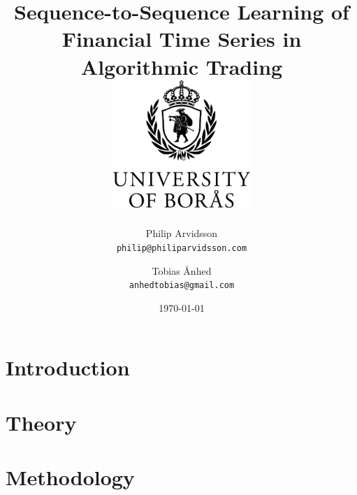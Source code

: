 \documentclass[11pt]{report}
\title{
  {\huge{Sequence-to-Sequence Learning of Financial Time Series in Algorithmic
         Trading}}\\
  \vspace{10ex}
  \includegraphics[width=52mm]{HB_EN_logo1_K}
  \vspace{4ex}
}
\author{
       \LARGE{Philip Arvidsson} \\ \texttt{philip@philiparvidsson.com}
  \and \LARGE{Tobias Ånhed}     \\ \texttt{anhedtobias@gmail.com}
}
\date{\vspace{10ex}\today}
\begin{document}
  \maketitle

  

  \begingroup
    \let\clearpage\relax
    \let\cleardoublepage\relax
    \tableofcontents
  \endgroup

  \chapter{Introduction}
  

  \chapter{Theory}
  

  \chapter{Methodology}
  

  {}
\end{document}
